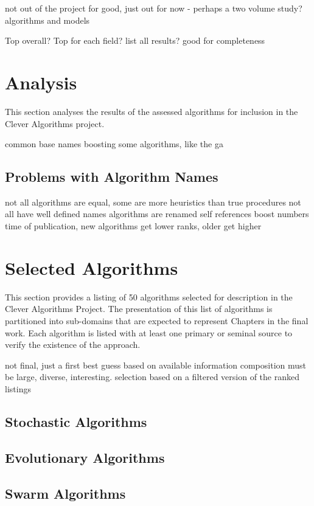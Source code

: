 \documentclass[a4paper, 11pt]{article}
\begin{document}
not out of the project for good, just out for now - perhaps a two volume study? algorithms and models

Top overall?
Top for each field?
list all results? good for completeness 

% 
% 
\section{Analysis}
\label{sec:analysis}
This section analyses the results of the assessed algorithms for inclusion in the Clever Algorithms project.

common base names boosting some algorithms, like the ga


\subsection{Problems with Algorithm Names}
not all algorithms are equal, some are more heuristics than true procedures
not all have well defined names
algorithms are renamed
self references boost numbers
time of publication, new algorithms get lower ranks, older get higher





\section{Selected Algorithms}
\label{sec:selection}
This section provides a listing of 50 algorithms selected for description in the Clever Algorithms Project. The presentation of this list of algorithms is partitioned into sub-domains that are expected to represent Chapters in the final work. Each algorithm is listed with at least one primary or seminal source to verify the existence of the approach.

not final, just a first best guess based on available information
composition must be large, diverse, interesting. 
selection based on a filtered version of the ranked listings

\subsection{Stochastic Algorithms}

\subsection{Evolutionary Algorithms}

\subsection{Swarm Algorithms}
\end{document}
